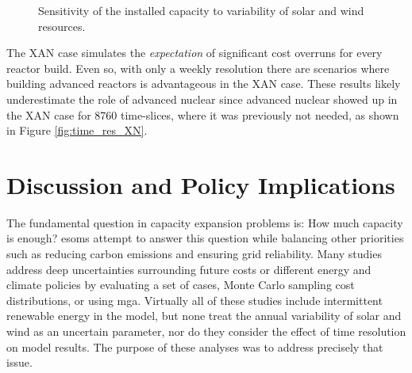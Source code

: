 \begin{figure}[H]
  \centering
  \resizebox{0.95\columnwidth}{!}{}
  \caption{Sensitivity of the installed capacity to variability of
   solar and wind resources.}
  \label{fig:il_capacity}
\end{figure}

The XAN case simulates the
\textit{expectation} of significant cost overruns for every reactor build. Even so,
with only a weekly resolution there are scenarios where building advanced reactors
is advantageous in the XAN case. These results likely underestimate the role of
advanced nuclear since advanced nuclear showed up in the XAN case for 8760
time-slices, where it was previously not needed, as shown in Figure \ref{fig:time_res_XN}.

\section{Discussion and Policy Implications}

The fundamental question in capacity expansion problems is: How much capacity is enough?
\glspl{esom} attempt to answer this question while balancing other priorities such
as reducing carbon emissions and ensuring grid reliability. Many studies address
deep uncertainties surrounding future costs
\cite{alzbutas_uncertainty_2012,barron_differential_2015,komiyama_energy_2015,
li_open_2020,yue_least_2020} or different energy and climate policies \cite{bennett_extending_2021,
bouckaert_expanding_2014,de_sisternes_value_2016,decarolis_modelling_2016,neumann_near-optimal_2021,
seck_embedding_2020} by evaluating a set of cases, Monte Carlo sampling cost distributions,
or using \gls{mga}. Virtually all of these studies include intermittent renewable
energy in the model, but none treat the annual variability of solar and wind
as an uncertain parameter, nor do they consider the effect of time resolution on
model results. The purpose of these analyses was to address precisely that issue.

